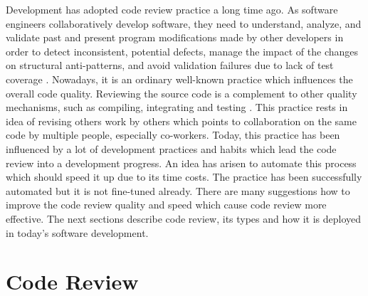 Development has adopted code review practice a long time ago. As software engineers collaboratively develop software, they need to understand, analyze, and validate past and present program modifications made by other developers in order to detect inconsistent, potential defects, manage the impact of the changes on structural anti-patterns, and avoid validation failures due to lack of test coverage \cite{CodeReview_bug_and_refactor}. Nowadays, it is an ordinary well-known practice which influences the overall code quality. Reviewing the source code is a complement to other quality mechanisms, such as compiling, integrating and testing \cite{CodeReview_types}. This practice rests in idea of revising others work by others which points to collaboration on the same code by multiple people, especially co-workers. Today, this practice has been influenced by a lot of development practices and habits which lead the code review into a development progress. An idea has arisen to automate this process which should speed it up due to its time costs. The practice has been successfully automated but it is not fine-tuned already. There are many suggestions how to improve the code review quality and speed which cause code review more effective. The next sections describe code review, its types and how it is deployed in today's software development.

\section{Code Review}

